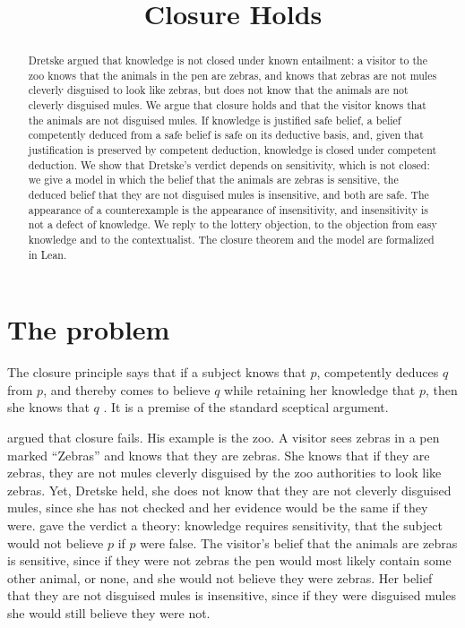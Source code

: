 \documentclass{situationist-preprint}
\title{Closure Holds}
\begin{document}
\maketitle

\begin{abstract}
Dretske argued that knowledge is not closed under known entailment: a visitor to the zoo knows that the animals in the pen are zebras, and knows that zebras are not mules cleverly disguised to look like zebras, but does not know that the animals are not cleverly disguised mules. We argue that closure holds and that the visitor knows that the animals are not disguised mules. If knowledge is justified safe belief, a belief competently deduced from a safe belief is safe on its deductive basis, and, given that justification is preserved by competent deduction, knowledge is closed under competent deduction. We show that Dretske's verdict depends on sensitivity, which is not closed: we give a model in which the belief that the animals are zebras is sensitive, the deduced belief that they are not disguised mules is insensitive, and both are safe. The appearance of a counterexample is the appearance of insensitivity, and insensitivity is not a defect of knowledge. We reply to the lottery objection, to the objection from easy knowledge and to the contextualist. The closure theorem and the model are formalized in Lean.
\end{abstract}

\section{The problem}

The closure principle says that if a subject knows that $p$, competently deduces $q$ from $p$, and thereby comes to believe $q$ while retaining her knowledge that $p$, then she knows that $q$ \citep{Williamson2000,Hawthorne2005}. It is a premise of the standard sceptical argument.

\citet{Dretske1970} argued that closure fails. His example is the zoo. A visitor sees zebras in a pen marked \enquote{Zebras} and knows that they are zebras. She knows that if they are zebras, they are not mules cleverly disguised by the zoo authorities to look like zebras. Yet, Dretske held, she does not know that they are not cleverly disguised mules, since she has not checked and her evidence would be the same if they were. \citet{Nozick1981} gave the verdict a theory: knowledge requires sensitivity, that the subject would not believe $p$ if $p$ were false. The visitor's belief that the animals are zebras is sensitive, since if they were not zebras the pen would most likely contain some other animal, or none, and she would not believe they were zebras. Her belief that they are not disguised mules is insensitive, since if they were disguised mules she would still believe they were not.
\end{document}
